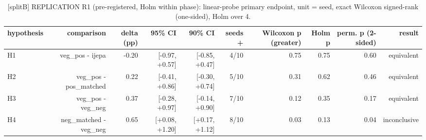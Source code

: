 \begin{table}[t]
\centering
\small
\caption{[splitB] REPLICATION R1 (pre-registered, Holm within phase): linear-probe primary endpoint, unit = seed, exact Wilcoxon signed-rank (one-sided), Holm over 4.}
\label{tab:primary_comparisons}
\begin{tabular}{lrrrrrrrrr}
\toprule
hypothesis & comparison & delta (pp) & 95\% CI & 90\% CI & seeds + & Wilcoxon p (greater) & Holm p & perm. p (2-sided) & result \\
\midrule
H1 & veg\_pos - ijepa & -0.20 & [-0.97, +0.57] & [-0.85, +0.47] & 4/10 & 0.75 & 0.75 & 0.60 & equivalent \\
H2 & veg\_pos - pos\_matched & 0.22 & [-0.41, +0.86] & [-0.30, +0.74] & 5/10 & 0.31 & 0.62 & 0.46 & equivalent \\
H3 & veg\_pos - veg\_neg & 0.37 & [-0.28, +0.97] & [-0.14, +0.90] & 7/10 & 0.12 & 0.35 & 0.17 & equivalent \\
H4 & neg\_matched - veg\_neg & 0.65 & [+0.08, +1.20] & [+0.17, +1.12] & 8/10 & 0.03 & 0.13 & 0.04 & inconclusive \\
\bottomrule
\end{tabular}
\end{table}
